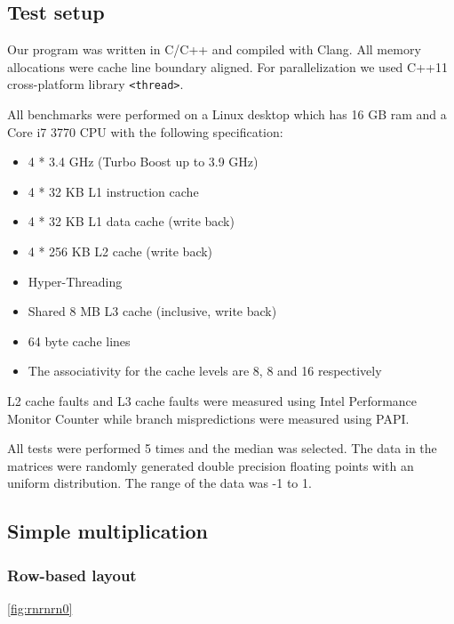 \subsection{Test setup}

Our program was written in C/C++ and compiled with Clang. All memory allocations were cache line boundary aligned. For parallelization we used C++11 cross-platform library \texttt{<thread>}.

All benchmarks were performed on a Linux desktop which has 16 GB ram and a Core i7 3770 CPU with the following specification:

\begin{itemize}
\item 4 * 3.4 GHz (Turbo Boost up to 3.9 GHz)
\item 4 * 32 KB L1 instruction cache
\item 4 * 32 KB L1 data cache (write back)
\item 4 * 256 KB L2 cache (write back)
\item Hyper-Threading
\item Shared 8 MB L3 cache (inclusive, write back)
\item 64 byte cache lines
\item The associativity for the cache levels are 8, 8 and 16 respectively
\end{itemize}

L2 cache faults and L3 cache faults were measured using Intel Performance Monitor Counter while branch mispredictions were measured using PAPI.

All tests were performed 5 times and the median was selected. The data in the matrices were randomly generated double precision floating points with
an uniform distribution. The range of the data was -1 to
1.

\subsection{Simple multiplication}

\subsubsection{Row-based layout}

\ref{fig:rnrnrn0}

